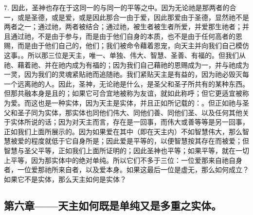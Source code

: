7. 因此，圣神也存在于这同一的与同一的平等之中。因为无论祂是那两者的合一，或是圣德，或是爱，或是因此那合一由于爱，因此那爱由于圣德，显然祂不是两者之一；通过祂，两者被结合；通过祂，被生者被生者所爱，并爱那生祂者；并且通过祂，不是由于参与，而是由于他们自身的本质，也不是由于任何高者的恩赐，而是由于他们自己的，他们；我们被命令藉着恩宠，向天主并向我们自己模仿这事。。所以那三位是天主，唯一、单独、伟大、智慧、圣善、有福的。但我们从祂、藉着祂、并在祂内成为有福的；因为我们自己藉祂的恩赐成为一，并与祂成为一灵，因为我们的灵魂紧贴祂而追随祂。我们紧贴天主是有益的，因为祂必毁灭每一个远离祂的人。因此，圣神，无论祂是什么，是圣父和圣子所共有的某种东西。但那共融本身是且的；如果它可合宜地被称为友谊，就如此称呼；但它更适宜被称为爱。而这也是一种实体，因为天主是实体，并且正如所记载的：。但正如祂与圣父和圣子同为实体，那实体也同他们伟大、同他们善、同他们圣、以及任何其他关于实体所说的话；因为对天主而言，存在是一回事，而伟大或善等等是另一回事，正如我们上面所展示的。因为如果爱在其中（即在天主内）不如智慧伟大，那么智慧被爱的程度就低于它自身所是；因此爱是平等的，以便智慧按其存在而被爱；但智慧与圣父平等，正如我们上面所证明的；因此圣神也平等；如果平等，就在一切上平等，因为那实体中的绝对单纯。所以它们不多于三位：一位爱那来自祂自身者，一位爱那祂所来自者，以及爱本身。如果这最后一位是虚无，那么如何成立？如果它不是实体，那么天主如何是实体？\par


\subsection{第六章——天主如何既是单纯又是多重之实体。}

